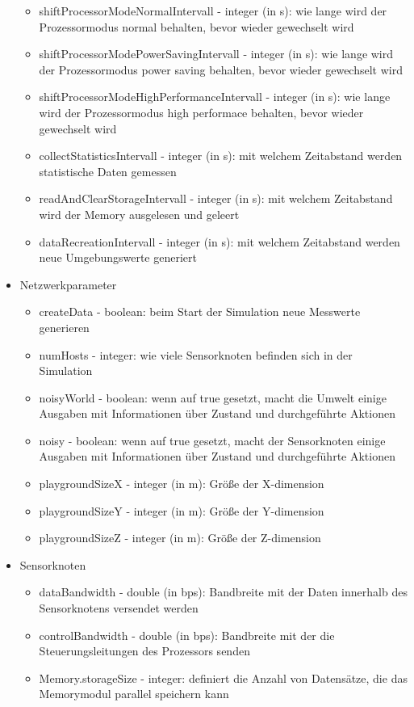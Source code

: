\begin{itemize}
\begin{itemize}
\item shiftProcessorModeNormalIntervall - integer (in s): wie lange wird der Prozessormodus normal behalten, bevor wieder gewechselt wird
\item shiftProcessorModePowerSavingIntervall - integer (in s): wie lange wird der Prozessormodus power saving behalten, bevor wieder gewechselt wird
\item shiftProcessorModeHighPerformanceIntervall - integer (in s): wie lange wird der Prozessormodus high performace behalten, bevor wieder gewechselt wird
\item collectStatisticsIntervall - integer (in s): mit welchem Zeitabstand werden statistische Daten gemessen
\item readAndClearStorageIntervall - integer (in s): mit welchem Zeitabstand wird der Memory ausgelesen und geleert
\item dataRecreationIntervall - integer (in s): mit welchem Zeitabstand werden neue Umgebungswerte generiert
\end{itemize}
\item Netzwerkparameter
\begin{itemize}
\item createData - boolean: beim Start der Simulation neue Messwerte generieren
\item numHosts - integer: wie viele Sensorknoten befinden sich in der Simulation
\item noisyWorld - boolean: wenn auf true gesetzt, macht die Umwelt einige Ausgaben mit Informationen über Zustand und durchgeführte Aktionen
\item noisy - boolean: wenn auf true gesetzt, macht der Sensorknoten einige Ausgaben mit Informationen über Zustand und durchgeführte Aktionen
\item playgroundSizeX - integer (in m): Größe der X-dimension
\item playgroundSizeY - integer (in m): Größe der Y-dimension
\item playgroundSizeZ - integer (in m): Größe der Z-dimension
\end{itemize}
\item Sensorknoten
\begin{itemize}
\item dataBandwidth - double (in bps): Bandbreite mit der Daten innerhalb des Sensorknotens versendet werden
\item controlBandwidth - double (in bps): Bandbreite mit der die Steuerungsleitungen des Prozessors senden
\item Memory.storageSize - integer: definiert die Anzahl von Datensätze, die das Memorymodul parallel speichern kann
\end{itemize}
\end{itemize}

